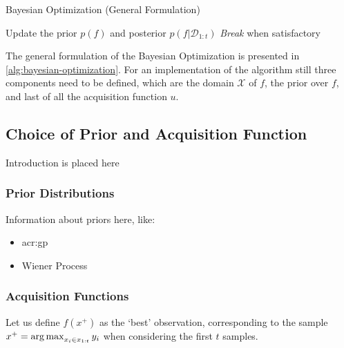 
\begin{algorithm}
	\caption{Bayesian Optimization (General Formulation) \label{alg:bayesian-optimization}}
	\begin{algorithmic}[1]
		 
			 
			\State Update the prior $p(f)$ and posterior $p(f \vert \mathcal{D}_{1:t})$
			\State \textit{Break} when satisfactory 
		\EndFor
		\State {}
	\end{algorithmic}
\end{algorithm}

The general formulation of the Bayesian Optimization is presented in \autoref{alg:bayesian-optimization}.
For an implementation of the algorithm still three components need to be defined, which are the domain $\mathcal{X}$ of $f$, the prior over $f$, and last of all the acquisition function $u$.

\subsection{Choice of Prior and Acquisition Function}
\label{sec:bayesian-optimization-prior-acquisition}
Introduction is placed here %

\subsubsection*{Prior Distributions}
\label{sec:bayesian-optimization-prior}
Information about priors here, like: %
\begin{itemize}
	\item \acrfull{acr:gp}
	\item Wiener Process
\end{itemize}


\subsubsection*{Acquisition Functions}
\label{sec:bayesian-optimization-acquisition}
Let us define $f(x^+)$ as the `best' observation, corresponding to the sample $x^+ = \operatorname*{arg\,max}_{x_i \in x_{1:t}} y_i$ when considering the first $t$ samples.

